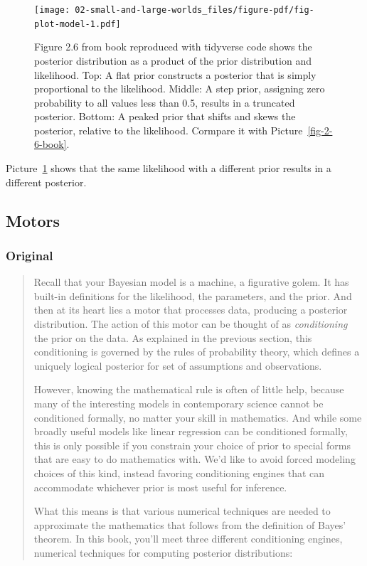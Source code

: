\documentclass[
  letterpaper,
  DIV=11,
  numbers=noendperiod]{scrreprt}
\begin{document}
\begin{figure}[H]

{\centering \texttt{[image: 02-small-and-large-worlds\_files/figure-pdf/fig-plot-model-1.pdf]}

}

\caption{\label{fig-plot-model}Figure 2.6 from book reproduced with
tidyverse code shows the posterior distribution as a product of the
prior distribution and likelihood. Top: A flat prior constructs a
posterior that is simply proportional to the likelihood. Middle: A step
prior, assigning zero probability to all values less than 0.5, results
in a truncated posterior. Bottom: A peaked prior that shifts and skews
the posterior, relative to the likelihood. Cormpare it with
Picture~\ref{fig-2-6-book}.}

\end{figure}

Picture~\ref{fig-plot-model} shows that the same likelihood with a
different prior results in a different posterior.

\hypertarget{motors}{%
\subsection{Motors}\label{motors}}

\hypertarget{original-5}{%
\subsubsection{Original}\label{original-5}}

\begin{quote}
Recall that your Bayesian model is a machine, a figurative golem. It has
built-in definitions for the likelihood, the parameters, and the prior.
And then at its heart lies a motor that processes data, producing a
posterior distribution. The action of this motor can be thought of as
\emph{conditioning} the prior on the data. As explained in the previous
section, this conditioning is governed by the rules of probability
theory, which defines a uniquely logical posterior for set of
assumptions and observations.

However, knowing the mathematical rule is often of little help, because
many of the interesting models in contemporary science cannot be
conditioned formally, no matter your skill in mathematics. And while
some broadly useful models like linear regression can be conditioned
formally, this is only possible if you constrain your choice of prior to
special forms that are easy to do mathematics with. We'd like to avoid
forced modeling choices of this kind, instead favoring conditioning
engines that can accommodate whichever prior is most useful for
inference.

What this means is that various numerical techniques are needed to
approximate the mathematics that follows from the definition of Bayes'
theorem. In this book, you'll meet three different conditioning engines,
numerical techniques for computing posterior distributions:
\end{quote}
\end{document}

